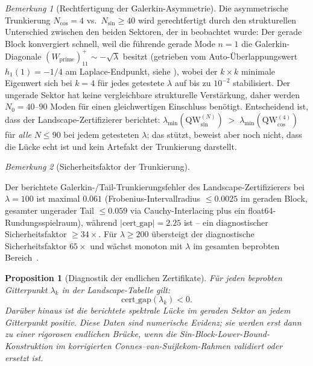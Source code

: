 \documentclass[11pt,a4paper]{article}
\newtheorem{proposition}[proposition]{Proposition}
\theoremstyle{remark}
\newtheorem{remark}[remark]{Bemerkung}
\theoremstyle{plain}
\begin{document}
\begin{remark}[Rechtfertigung der Galerkin-Asymmetrie]
\label{rem:galerkin-asymmetry}
Die asymmetrische Trunkierung $N_{\cos}=4$ vs.\ $N_{\sin}\geq 40$ wird gerechtfertigt durch den strukturellen Unterschied zwischen den beiden Sektoren, der in \cite[Abschnitt~2.4 und Bemerkung zur Low-Mode Dominanz]{GeigerLandscapeII} beobachtet wurde: Der gerade Block konvergiert schnell, weil die führende gerade Mode $n=1$ die Galerkin-Diagonale $(W_{\mathrm{prime}})_{11}^+ \sim -\sqrt\lambda$ besitzt (getrieben vom Auto-Überlappungswert $h_1(1)=-1/4$ am Laplace-Endpunkt, siehe ), wobei der $k\times k$ minimale Eigenwert sich bei $k=4$ für jedes getestete $\lambda$ auf bis zu $10^{-2}$ stabilisiert. Der ungerade Sektor hat keine vergleichbare strukturelle Verstärkung, daher werden $N_0=40$--$90$ Moden für einen gleichwertigen Einschluss benötigt. Entscheidend ist, dass der Landscape-Zertifizierer berichtet:
\(
  \lambda_{\min}(\mathrm{QW}_{\sin}^{(N)})\;>\;\lambda_{\min}(\mathrm{QW}_{\cos}^{(4)})
\)
für \emph{alle} $N\leq 90$ bei jedem getesteten $\lambda$; das stützt, beweist aber noch nicht, dass die Lücke echt ist und kein Artefakt der Trunkierung darstellt.
\end{remark}

\begin{remark}[Sicherheitsfaktor der Trunkierung]
\label{rem:truncation-safety}
\begin{sloppypar}
Der berichtete Galerkin-/Tail-Trunkierungsfehler des Landscape-Zertifizierers bei $\lambda=100$ ist maximal $0.061$ (Frobenius-Intervallradius $\leq 0.0025$ im geraden Block, gesamter ungerader Tail $\leq 0.059$ via Cauchy-Interlacing plus ein float64-Rundungsspielraum), während $|\mathrm{cert\_gap}|=2.25$ ist -- ein diagnostischer Sicherheitsfaktor $\geq 34\times$. Für $\lambda\geq 200$ übersteigt der diagnostische Sicherheitsfaktor $65\times$ und wächst monoton mit $\lambda$ im gesamten beprobten Bereich~\cite[Abschnitt~2.9 und Zertifikats-Metadaten]{GeigerLandscapeII}.
\end{sloppypar}
\end{remark}

\begin{proposition}[Diagnostik der endlichen Zertifikate]
\label{prop:finite-certificates}
Für jeden beprobten Gitterpunkt $\lambda_k$ in der Landscape-Tabelle gilt:
\[
  \mathrm{cert\_gap}(\lambda_k)<0.
\]
Darüber hinaus ist die berichtete spektrale Lücke im geraden Sektor an jedem Gitterpunkt positiv. Diese Daten sind numerische Evidenz; sie werden erst dann zu einer rigorosen endlichen Brücke, wenn die Sin-Block-Lower-Bound-Konstruktion im korrigierten Connes--van-Suijlekom-Rahmen validiert oder ersetzt ist.
\end{proposition}
\end{document}
